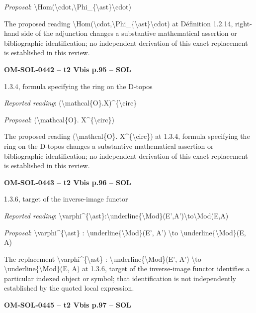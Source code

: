 \emph{Proposal}: \textbackslash{}Hom(\textbackslash{}cdot,\textbackslash{}Phi\_\{\textbackslash{}ast\}\textbackslash{}cdot)\par
The proposed reading \textbackslash{}Hom(\textbackslash{}cdot,\textbackslash{}Phi\_\{\textbackslash{}ast\}\textbackslash{}cdot) at Définition 1.2.14, right-hand side of the adjunction changes a substantive mathematical assertion or bibliographic identification; no independent derivation of this exact replacement is established in this review.\par
\par\noindent\textbf{OM-SOL-0442 -- t2 Vbis p.95 -- SOL}\par
1.3.4, formula specifying the ring on the D-topos\par
\emph{Reported reading}: (\textbackslash{}mathcal\{O\}.X)\textasciicircum{}\{\textbackslash{}circ\}\par
\emph{Proposal}: (\textbackslash{}mathcal\{O\}. X\textasciicircum{}\{\textbackslash{}circ\})\par
The proposed reading (\textbackslash{}mathcal\{O\}. X\textasciicircum{}\{\textbackslash{}circ\}) at 1.3.4, formula specifying the ring on the D-topos changes a substantive mathematical assertion or bibliographic identification; no independent derivation of this exact replacement is established in this review.\par
\par\noindent\textbf{OM-SOL-0443 -- t2 Vbis p.96 -- SOL}\par
1.3.6, target of the inverse-image functor\par
\emph{Reported reading}: \textbackslash{}varphi\textasciicircum{}\{\textbackslash{}ast\}:\textbackslash{}underline\{\textbackslash{}Mod\}(E',A')\textbackslash{}to\textbackslash{}Mod(E,A)\par
\emph{Proposal}: \textbackslash{}varphi\textasciicircum{}\{\textbackslash{}ast\} : \textbackslash{}underline\{\textbackslash{}Mod\}(E', A') \textbackslash{}to \textbackslash{}underline\{\textbackslash{}Mod\}(E, A)\par
The replacement \textbackslash{}varphi\textasciicircum{}\{\textbackslash{}ast\} : \textbackslash{}underline\{\textbackslash{}Mod\}(E', A') \textbackslash{}to \textbackslash{}underline\{\textbackslash{}Mod\}(E, A) at 1.3.6, target of the inverse-image functor identifies a particular indexed object or symbol; that identification is not independently established by the quoted local expression.\par
\par\noindent\textbf{OM-SOL-0445 -- t2 Vbis p.97 -- SOL}\par
